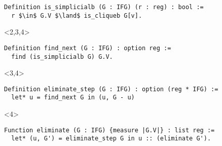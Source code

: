 
\begin{overlayarea}{\textwidth}{8cm}
\begin{onlyenv}
\begin{lstlisting}[style=Rocq]
Definition is_simplicialb (G : IFG) (r : reg) : bool :=
  r $\in$ G.V $\land$ is_cliqueb G[v].
\end{lstlisting}
\end{onlyenv}

\begin{onlyenv}<2,3,4>
\begin{lstlisting}[style=Rocq]
Definition find_next (G : IFG) : option reg :=
  find (is_simplicialb G) G.V.
\end{lstlisting}
\end{onlyenv}

\begin{onlyenv}<3,4>
\begin{lstlisting}[style=Rocq]
Definition eliminate_step (G : IFG) : option (reg * IFG) :=
  let* u = find_next G in (u, G - u)
\end{lstlisting}
\end{onlyenv}

\begin{onlyenv}<4>
\begin{lstlisting}[style=Rocq]
Function eliminate (G : IFG) {measure |G.V|} : list reg :=
  let* (u, G') = eliminate_step G in u :: (eliminate G').
\end{lstlisting}
\end{onlyenv}
\end{overlayarea}